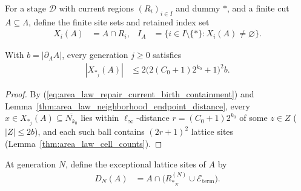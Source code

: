 \begin{definition}
    \label{def:area_law_repair_region_sites}
    \leanok
    For a stage $\mathcal D$ with current regions $(R_i)_{i\in I}$ and dummy $*$, and a finite
    cut $A\subseteq\Lambda$, define the finite site sets and retained index set
    \begin{align}
        X_i(A) & = A\cap R_i,
               & I_A          & = \{i\in I\setminus\{*\}:X_i(A)\ne\varnothing\}.
        \label{eq:area_law_repair_region_sites}
    \end{align}
\end{definition}

\begin{lemma}
    \label{thm:area_law_repair_dummy_sites_count}
    \leanok
    With $b=|\partial_\Lambda A|$, every generation $j\ge0$ satisfies
    \begin{align}
        |X_{*_j}(A)|
         & \le 2\bigl(2(C_0+1)2^{k_0}+1\bigr)^2 b.
        \label{eq:area_law_repair_dummy_sites_count}
    \end{align}
\end{lemma}

\begin{proof}\leanok
    By (\ref{eq:area_law_repair_current_birth_containment}) and
    Lemma~\ref{thm:area_law_neighborhood_endpoint_distance}, every $x\in X_{*_j}(A)\subseteq\overline{N_{k_0}}$
    lies within $\ell_\infty$-distance $r=(C_0+1)2^{k_0}$ of some $z\in Z$ ($|Z|\le2b$), and each
    such ball contains $(2r+1)^2$ lattice sites (Lemma~\ref{thm:area_law_cell_counts}).
\end{proof}

\begin{definition}
    \label{def:area_law_repair_exceptional_sites}
    \leanok
    At generation $N$, define the exceptional lattice sites of $A$ by
    \begin{align}
        D_N(A)
         & = A\cap\bigl(R_{*_N}^{(N)}\cup\mathcal E_{\mathrm{term}}\bigr).
        \label{eq:area_law_repair_exceptional_sites}
    \end{align}
\end{definition}

